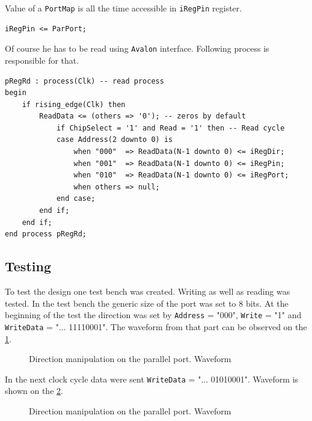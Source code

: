 Value of a \verb|PortMap| is all the time accessible in \verb|iRegPin| register.
\begin{verbatim}
iRegPin <= ParPort;
\end{verbatim}
Of course he has to be read using \verb|Avalon| interface. Following process is responsible for that.
\begin{verbatim}
pRegRd : process(Clk) -- read process
begin
    if rising_edge(Clk) then
        ReadData <= (others => '0'); -- zeros by default
            if ChipSelect = '1' and Read = '1' then -- Read cycle
            case Address(2 downto 0) is
                when "000"  => ReadData(N-1 downto 0) <= iRegDir;
                when "001"  => ReadData(N-1 downto 0) <= iRegPin;
                when "010"  => ReadData(N-1 downto 0) <= iRegPort;
                when others => null;
            end case;
        end if;
    end if;
end process pRegRd;
\end{verbatim}
\subsection{Testing}
To test the design one test bench was created. Writing as well as reading was tested. In the test bench the generic size of the port was set to 8 bits. At the beginning of the test the direction was set by \verb|Address| = "000", \verb|Write| = "1" and \verb|WriteData| = "... 11110001". The waveform from that part can be observed on the \figurename{} \ref{fig:parallel_direction}.
\begin{figure}[H]
	\begin{center}
	\end{center}
	\caption{Direction manipulation on the parallel port. Waveform}
	\label{fig:parallel_direction}
\end{figure}

In the next clock cycle data were sent \verb|WriteData| = "... 01010001". Waveform is shown on the 
\figurename{} \ref{fig:parallel_data_write}.
\begin{figure}[H]
	\begin{center}
	\end{center}
	\caption{Direction manipulation on the parallel port. Waveform}
	\label{fig:parallel_data_write}
\end{figure}

